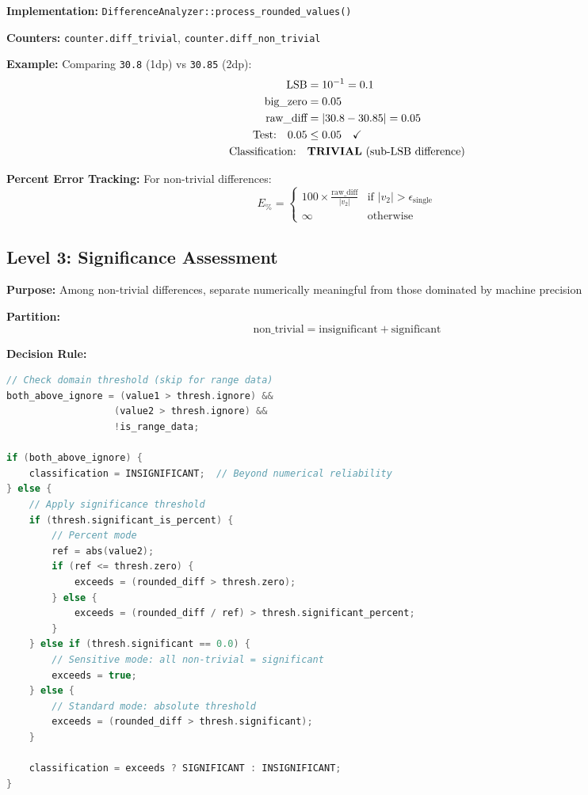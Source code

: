 \textbf{Implementation:} \texttt{DifferenceAnalyzer::process\_rounded\_values()}

\textbf{Counters:} \texttt{counter.diff\_trivial}, \texttt{counter.diff\_non\_trivial}

\textbf{Example:} Comparing \texttt{30.8} (1dp) vs \texttt{30.85} (2dp):
\begin{align*}
    \mathrm{LSB} &= 10^{-1} = 0.1 \\
    \text{big\_zero} &= 0.05 \\
    \text{raw\_diff} &= |30.8 - 30.85| = 0.05 \\
    \text{Test:} \quad 0.05 &\leq 0.05 \quad \checkmark \\
    \text{Classification:} \quad & \textbf{TRIVIAL} \text{ (sub-LSB difference)}
\end{align*}

\textbf{Percent Error Tracking:} For non-trivial differences:
\begin{equation}
    E_{\%} = \begin{cases}
        100 \times \frac{\text{raw\_diff}}{|v_2|} & \text{if } |v_2| > \epsilon_{\text{single}} \\
        \infty & \text{otherwise}
    \end{cases}
\end{equation}

\subsection{Level 3: Significance Assessment}

\textbf{Purpose:} Among non-trivial differences, separate numerically meaningful from those dominated by machine precision

\textbf{Partition:}
\begin{equation}
    \text{non\_trivial} = \text{insignificant} + \text{significant}
\end{equation}

\textbf{Decision Rule:}
\begin{lstlisting}[language=C++]
// Check domain threshold (skip for range data)
both_above_ignore = (value1 > thresh.ignore) &&
                   (value2 > thresh.ignore) &&
                   !is_range_data;

if (both_above_ignore) {
    classification = INSIGNIFICANT;  // Beyond numerical reliability
} else {
    // Apply significance threshold
    if (thresh.significant_is_percent) {
        // Percent mode
        ref = abs(value2);
        if (ref <= thresh.zero) {
            exceeds = (rounded_diff > thresh.zero);
        } else {
            exceeds = (rounded_diff / ref) > thresh.significant_percent;
        }
    } else if (thresh.significant == 0.0) {
        // Sensitive mode: all non-trivial = significant
        exceeds = true;
    } else {
        // Standard mode: absolute threshold
        exceeds = (rounded_diff > thresh.significant);
    }

    classification = exceeds ? SIGNIFICANT : INSIGNIFICANT;
}
\end{lstlisting}

